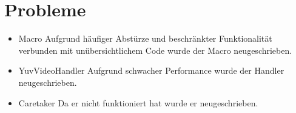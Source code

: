 \chapter{Probleme}
\begin{itemize}
\item Macro \newline
Aufgrund häufiger Abstürze und beschränkter Funktionalität verbunden mit unübersichtlichem Code wurde der Macro neugeschrieben.
\item YuvVideoHandler \newline
Aufgrund schwacher Performance wurde der Handler neugeschrieben.
\item Caretaker \newline
Da er nicht funktioniert hat wurde er neugeschrieben.
\end{itemize}